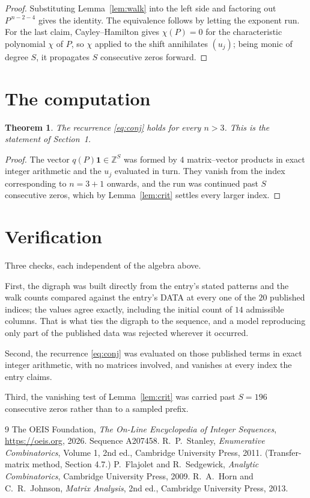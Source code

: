 \documentclass[11pt,a4paper]{article}
\theoremstyle{plain}
\newtheorem{theorem}{Theorem}
\theoremstyle{definition}
\begin{document}
\begin{proof}
Substituting Lemma~\ref{lem:walk} into the left side and factoring out
$P^{\,n-2-4}$ gives the identity. The equivalence follows by letting the exponent
run. For the last claim, Cayley--Hamilton gives $\chi(P)=0$ for the characteristic
polynomial $\chi$ of $P$, so $\chi$ applied to the shift annihilates $(u_j)$; being monic of
degree $S$, it propagates $S$ consecutive zeros forward.
\end{proof}

\section{The computation}

\begin{theorem}
The recurrence \eqref{eq:conj} holds for every $n>3$. This is the statement of
Section~1.
\end{theorem}

\begin{proof}
The vector $q(P)\mathbf{1}\in\mathbb{Z}^{S}$ was formed by $4$ matrix--vector
products in exact integer arithmetic and the $u_j$ evaluated in turn. They vanish from the
index corresponding to $n=3+1$ onwards, and the run was continued past $S$ consecutive
zeros, which by Lemma~\ref{lem:crit} settles every larger index.
\end{proof}

\section{Verification}

Three checks, each independent of the algebra above.

First, the digraph was built directly from the entry's stated patterns and the walk counts
compared against the entry's DATA at every one of the $20$ published indices; the
values agree exactly, including the initial count of $14$ admissible columns. That is
what ties the digraph to the sequence, and a model reproducing only part of the published
data was rejected wherever it occurred.

Second, the recurrence \eqref{eq:conj} was evaluated on those published terms in exact
integer arithmetic, with no matrices involved, and vanishes at every index the entry claims.

Third, the vanishing test of Lemma~\ref{lem:crit} was carried past $S=196$ consecutive
zeros rather than to a sampled prefix.

\begin{thebibliography}{9}
 The OEIS Foundation, \emph{The On-Line Encyclopedia of Integer
Sequences}, \url{https://oeis.org}, 2026. Sequence A207458.
 R.~P.~Stanley, \emph{Enumerative Combinatorics}, Volume 1, 2nd ed.,
Cambridge University Press, 2011. (Transfer-matrix method, Section 4.7.)
 P.~Flajolet and R.~Sedgewick, \emph{Analytic Combinatorics}, Cambridge
University Press, 2009.
 R.~A.~Horn and C.~R.~Johnson, \emph{Matrix Analysis}, 2nd ed., Cambridge
University Press, 2013.
\end{thebibliography}
\end{document}
